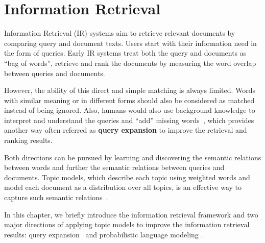 \chapter{Information Retrieval}
\label{ch:ir}

Information Retrieval (IR) systems aim to retrieve relevant documents by comparing query and document texts. Users start with their information need in the form of queries. Early IR systems treat both the query and documents as ``bag of words'', retrieve and rank the documents by measuring the word overlap between queries and documents. 

However, the ability of this direct and simple matching is always limited. Words with similar meaning or in different forms should also be considered as matched instead of being ignored. Also, humans would also use background knowledge to interpret and understand the queries and ``add'' missing words~\citep{wei-07}, which provides another way often referred as \textbf{query expansion} to improve the retrieval and ranking results.

Both directions can be pursued by learning and discovering the semantic relations between words and further the semantic relations between queries and documents. Topic models, which describe each topic using weighted words and model each document as a distribution over all topics, is an effective way to capture such semantic relations~\citep{deerwester-90,hofmann-99a}.

In this chapter, we briefly introduce the information retrieval framework and two major directions of applying topic models to improve the information retrieval results: query expansion~\citep{Park-2009,Andrzejewski-2011} and probabilistic language modeling \citep{Lu-2011,wei-06}.





